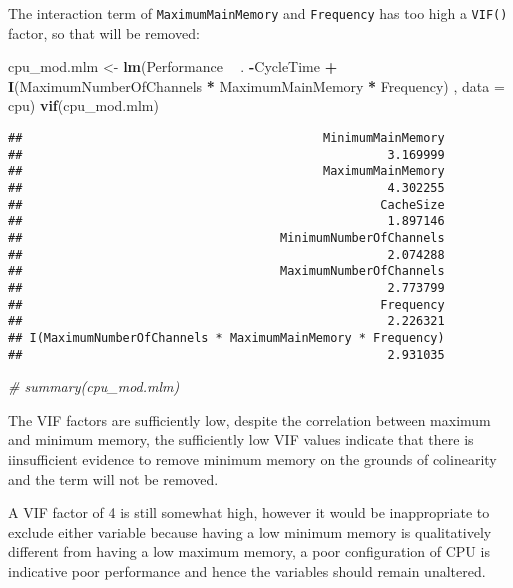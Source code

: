 \documentclass[12pt]{article}
\newenvironment{Shaded}{\begin{snugshade}}{\end{snugshade}}
\newcommand{\CommentTok}[1]{\textcolor[rgb]{0.56,0.35,0.01}{\textit{#1}}}
\newcommand{\DataTypeTok}[1]{\textcolor[rgb]{0.13,0.29,0.53}{#1}}
\newcommand{\KeywordTok}[1]{\textcolor[rgb]{0.13,0.29,0.53}{\textbf{#1}}}
\newcommand{\NormalTok}[1]{#1}
\newcommand{\OperatorTok}[1]{\textcolor[rgb]{0.81,0.36,0.00}{\textbf{#1}}}
\newcommand{\StringTok}[1]{\textcolor[rgb]{0.31,0.60,0.02}{#1}}
\begin{document}
The interaction term of \texttt{MaximumMainMemory} and
\texttt{Frequency} has too high a \texttt{VIF()} factor, so that will be
removed:

\begin{Shaded}
\begin{Highlighting}[]
\NormalTok{cpu_mod.mlm <-}\StringTok{ }\KeywordTok{lm}\NormalTok{(Performance }\OperatorTok{~}\StringTok{ }\NormalTok{. }\OperatorTok{-}\NormalTok{CycleTime }\OperatorTok{+}\StringTok{ }\KeywordTok{I}\NormalTok{(MaximumNumberOfChannels }\OperatorTok{*}\StringTok{ }\NormalTok{MaximumMainMemory }\OperatorTok{*}\StringTok{ }\NormalTok{Frequency)  , }\DataTypeTok{data =}\NormalTok{ cpu) }
\KeywordTok{vif}\NormalTok{(cpu_mod.mlm)}
\end{Highlighting}
\end{Shaded}

\begin{verbatim}
##                                          MinimumMainMemory 
##                                                   3.169999 
##                                          MaximumMainMemory 
##                                                   4.302255 
##                                                  CacheSize 
##                                                   1.897146 
##                                    MinimumNumberOfChannels 
##                                                   2.074288 
##                                    MaximumNumberOfChannels 
##                                                   2.773799 
##                                                  Frequency 
##                                                   2.226321 
## I(MaximumNumberOfChannels * MaximumMainMemory * Frequency) 
##                                                   2.931035
\end{verbatim}

\begin{Shaded}
\begin{Highlighting}[]
\CommentTok{# summary(cpu_mod.mlm)}
\end{Highlighting}
\end{Shaded}

The VIF factors are sufficiently low, despite the correlation between
maximum and minimum memory, the sufficiently low VIF values indicate
that there is iinsufficient evidence to remove minimum memory on the
grounds of colinearity and the term will not be removed.

A VIF factor of 4 is still somewhat high, however it would be
inappropriate to exclude either variable because having a low minimum
memory is qualitatively different from having a low maximum memory, a
poor configuration of CPU is indicative poor performance and hence the
variables should remain unaltered.
\end{document}
